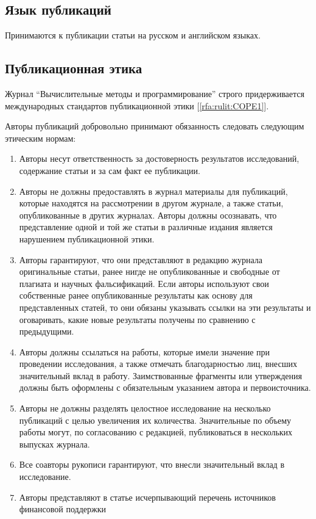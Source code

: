 \documentclass[10pt,a4paper]{book}
\begin{document}
\subsection{Язык публикаций}
Принимаются к публикации статьи на русском и английском языках.


\subsection{Публикационная этика}
Журнал ``Вычислительные методы и программирование'' строго придерживается международных
стандартов публикационной этики [\ref{rfa:rulit:COPE1}].

Авторы публикаций добровольно принимают обязанность следовать следующим этическим нормам:
\begin{enumerate}[itemsep=0pt,parsep=2pt,topsep=2pt,partopsep=0pt]
\item Авторы несут ответственность за достоверность результатов исследований, содержание
      статьи и за сам факт ее публикации.
\item Авторы не должны предоставлять в журнал материалы для публикаций, которые находятся 	   на рассмотрении в другом журнале, а также статьи, опубликованные в других журналах.
	Авторы должны осознавать, что представление одной и той же статьи в различные
	издания является нарушением публикационной этики.
\item Авторы гарантируют, что они представляют в редакцию журнала оригинальные статьи,
      ранее нигде не опубликованные и свободные от плагиата и научных фальсификаций.
      Если авторы используют свои собственные ранее опубликованные результаты как основу
      для представленных статей, то они обязаны указывать ссылки на эти результаты и
      оговаривать, какие новые результаты получены по сравнению с предыдущими.
\item Авторы должны ссылаться на работы, которые имели значение при проведении
      исследования, а также отмечать благодарностью лиц, внесших значительный вклад 
      в работу. Заимствованные фрагменты или утверждения должны быть оформлены с
      обязательным указанием автора и первоисточника.
\item Авторы не должны разделять целостное исследование на несколько публикаций с целью
      увеличения их количества. Значительные по объему работы могут, по согласованию
      с редакцией, публиковаться в нескольких выпусках журнала.
\item Все соавторы рукописи гарантируют, что внесли значительный вклад в исследование.
\item Авторы представляют в статье исчерпывающий перечень источников финансовой поддержки

\end{enumerate}
\end{document}
